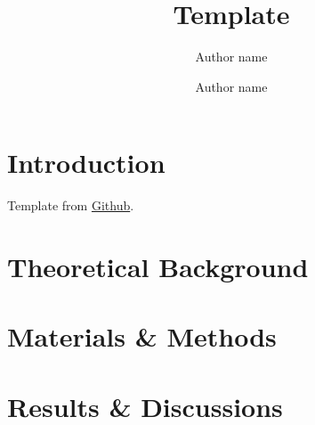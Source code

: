 \documentclass{article}
\title{Template}
\author[1]{Author name}
\author[2]{Author name}
\affil[1]{Department, University}
\affil[2]{Department, University}
\begin{document}
\maketitle


\begin{abstract}
	\lipsum[1]
\end{abstract}


\section{Introduction}
\label{sec:introduction}

Template from  \href{https://github.com/kourgeorge/arxiv-style}{Github}. \lipsum[1]

\section{Theoretical Background}
\label{sec:headings}

\lipsum[1]

\section{Materials \& Methods}
\label{sec:others}

\lipsum[1] \cite{kour2014real} 

\section{Results \& Discussions}
\label{sec:test}
\end{document}
